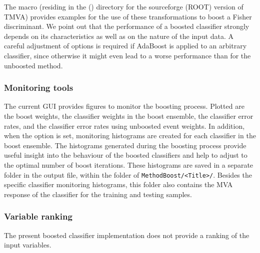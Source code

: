 The macro  (residing in the  () directory 
for the sourceforge (ROOT) version of TMVA) provides examples for the use of 
these transformations to boost a Fisher discriminant. We point out that the 
performance of a boosted classifier strongly depends on its characteristics
as well as on the nature of the input data. A careful adjustment of options is required
if AdaBoost is applied to an arbitrary classifier, since otherwise it might even 
lead to a worse performance than for the unboosted method.

\subsubsection{Monitoring tools}

The current GUI provides figures to monitor the boosting process. Plotted are 
the boost weights, the classifier weights in the boost ensemble, the classifier 
error rates, and the classifier error rates using unboosted event weights.
In addition, when the option  is set,
monitoring histograms are created for each classifier in the boost ensemble. 
The histograms generated during the boosting process provide useful insight 
into the behaviour of the boosted classifiers and help to adjust to the optimal 
number of boost iterations. These histograms are saved in a separate folder
in the output file, within the folder of {\tt MethodBoost/<Title>/}.
Besides the specific classifier monitoring histograms, this
folder also contains the MVA response of the classifier for the training
and testing samples.

\subsubsection{Variable ranking}

The present boosted classifier implementation does not provide a ranking of 
the input variables.
